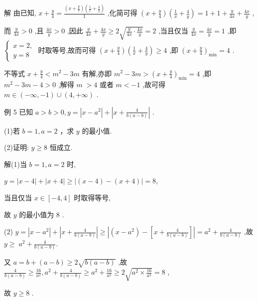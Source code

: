 \documentclass[10pt]{article}
\begin{document}
解 由已知, \(x + \frac{y}{4} = \frac{\left( {x + \frac{y}{4}}\right) \left( {\frac{1}{x} + \frac{4}{y}}\right) }{1}\) ,化简可得 \(\left( {x + \frac{y}{4}}\right) \left( {\frac{1}{x} + \frac{4}{y}}\right)  = 1 + 1 + \frac{y}{4x} + \frac{4x}{y}\) ,

而 \(\frac{y}{4x} > 0\) ,且 \(\frac{4x}{y} > 0\) ,因此 \(\frac{y}{4x} + \frac{4x}{y} \geq  2\sqrt{\frac{y}{4x} \cdot  \frac{4x}{y}} = 2\) ,当且仅当 \(\frac{y}{4x} = \frac{4x}{y} = 1\) ,即 \(\left\{  \begin{array}{l} x = 2, \\  y = 8 \end{array}\right.\) 时取等号,故而可得 \(\left( {x + \frac{y}{4}}\right) \left( {\frac{1}{x} + \frac{4}{y}}\right)  \geq  4\) ,即 \({\left( x + \frac{y}{4}\right) }_{\min } = 4\) .

不等式 \(x + \frac{y}{4} < {m}^{2} - {3m}\) 有解,亦即 \({m}^{2} - {3m} > {\left( x + \frac{y}{4}\right) }_{\min } = 4\) ,即 \({m}^{2} - {3m} - 4 > 0\) ,解得 \(m \; > 4\) 或者 \(m <  - 1\) ,故可得 \(m \in  \left( {-\infty , - 1}\right)  \cup  \left( {4, + \infty }\right)\) .

例 5 已知 \(a > b > 0,y = \left| {x - {a}^{2}}\right|  + \left| {x + \frac{4}{b\left( {a - b}\right) }}\right|\) .

(1)若 \(b = 1,a = 2\) ，求 \(y\) 的最小值.

(2)证明: \(y \geq  8\) 恒成立.

解(1)当 \(b = 1,a = 2\) 时,

\(y = \left| {x - 4}\right|  + \left| {x + 4}\right|  \geq  \left| {\left( {x - 4}\right)  - \left( {x + 4}\right) }\right|  = 8,\)

当且仅当 \(x \in  \left\lbrack  {-4,4}\right\rbrack\) 时取得等号,

故 \(y\) 的最小值为 8 .

(2) \(y = \left| {x - {a}^{2}}\right|  + \left| {x + \frac{4}{b\left( {a - b}\right) }}\right|  \geq  \left| {\left( {x - {a}^{2}}\right)  - \left\lbrack  {x + \frac{4}{b\left( {a - b}\right) }}\right\rbrack  }\right|  = {a}^{2} + \frac{4}{b\left( {a - b}\right) }\) ,故 \(y \geq \; {a}^{2} + \frac{4}{b\left( {a - b}\right) }.\)

又 \(a = b + \left( {a - b}\right)  \geq  2\sqrt{b\left( {a - b}\right) }\) ,故 \(\frac{4}{b\left( {a - b}\right) } \geq  \frac{16}{{a}^{2}},{a}^{2} + \frac{4}{b\left( {a - b}\right) } \geq  {a}^{2} + \frac{16}{{a}^{2}} \geq  2\sqrt{{a}^{2} \times  \frac{16}{{a}^{2}}} = 8\) ,

故 \(y \geq  8\) .
\end{document}
